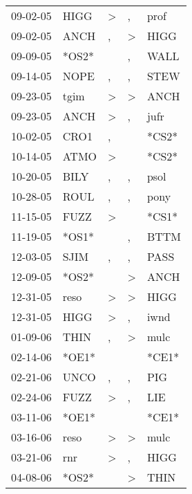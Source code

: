\begin{supertabular}{lllll}
 09-02-05 &   HIGG &     \textgreater &                , &   prof \\
 09-02-05 &   ANCH &                , &     \textgreater &   HIGG \\
 09-09-05 &  *OS2* &                  &                , &   WALL \\
 09-14-05 &   NOPE &                , &                , &   STEW \\
 09-23-05 &   tgim &     \textgreater &     \textgreater &   ANCH \\
 09-23-05 &   ANCH &     \textgreater &                , &   jufr \\
 10-02-05 &   CRO1 &                , &                  &  *CS2* \\
 10-14-05 &   ATMO &     \textgreater &                  &  *CS2* \\
 10-20-05 &   BILY &                , &                , &   psol \\
 10-28-05 &   ROUL &                , &                , &   pony \\
 11-15-05 &   FUZZ &     \textgreater &                  &  *CS1* \\
 11-19-05 &  *OS1* &                  &                , &   BTTM \\
 12-03-05 &   SJIM &                , &                , &   PASS \\
 12-09-05 &  *OS2* &                  &     \textgreater &   ANCH \\
 12-31-05 &   reso &     \textgreater &     \textgreater &   HIGG \\
 12-31-05 &   HIGG &     \textgreater &                , &   iwnd \\
 01-09-06 &   THIN &                , &     \textgreater &   mulc \\
 02-14-06 &  *OE1* &                  &                  &  *CE1* \\
 02-21-06 &   UNCO &                , &                , &    PIG \\
 02-24-06 &   FUZZ &     \textgreater &                , &    LIE \\
 03-11-06 &  *OE1* &                  &                  &  *CE1* \\
 03-16-06 &   reso &     \textgreater &     \textgreater &   mulc \\
 03-21-06 &    rnr &     \textgreater &                , &   HIGG \\
 04-08-06 &  *OS2* &                  &     \textgreater &   THIN \\

\end{supertabular}
